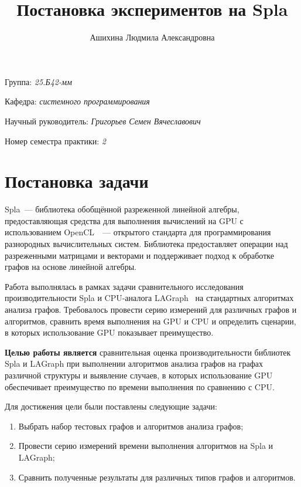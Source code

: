 \documentclass[a4paper]{article}
\title{Постановка экспериментов на Spla}
\author{Ашихина Людмила Александровна}
\date{}
\begin{document}
	
	\maketitle
	
	\begin{flushright}
		Группа: \emph{25.Б42-мм}
		
		Кафедра: \emph{системного программирования}
		
		Научный руководитель: \emph{Григорьев Семен Вячеславович}
		
		Номер семестра практики: \emph{2}
	\end{flushright} 
	
\section{Постановка задачи}

Spla~--- \cite{spla} библиотека обобщённой разреженной линейной алгебры, предоставляющая средства для выполнения вычислений на GPU с использованием OpenCL~\cite{OpenCl}~--- открытого стандарта для программирования разнородных вычислительных систем. Библиотека предоставляет операции над разреженными матрицами и векторами и поддерживает подход к обработке графов на основе линейной алгебры.
	
Работа выполнялась в рамках задачи сравнительного исследования производительности Spla и CPU-аналога LAGraph~\cite{LAGraph}  на стандартных алгоритмах анализа графов. Требовалось провести серию измерений для различных графов и алгоритмов, сравнить время выполнения на GPU и CPU и определить сценарии, в которых использование GPU показывает преимущество.
	
\textbf{Целью работы является} сравнительная оценка производительности библиотек Spla и LAGraph при выполнении алгоритмов анализа графов на графах различной структуры и выявление случаев, в которых использование GPU обеспечивает преимущество по времени выполнения по сравнению с CPU.
	
Для достижения цели были поставлены следующие задачи:
\begin{enumerate}
\item Выбрать набор тестовых графов и алгоритмов анализа графов;
\item Провести серию измерений времени выполнения алгоритмов на Spla и LAGraph;
\item Сравнить полученные результаты для различных типов графов и алгоритмов.
\end{enumerate}
	
\end{document}
